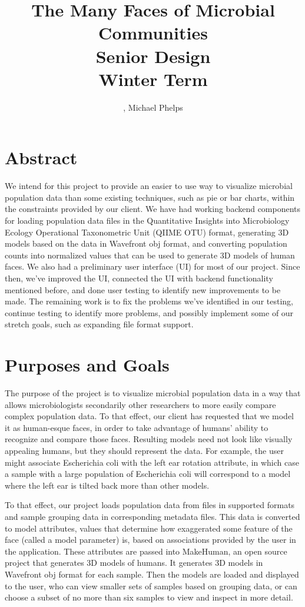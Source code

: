 \documentclass[letterpaper,10pt, onecolumn, draftclsnofoot]{IEEEtran}
\title{The Many Faces of Microbial Communities \\\large Senior Design\\Winter Term\\}
\author{\name, Michael Phelps}
\begin{document}
\maketitle
\section*{Abstract}
We intend for this project to provide an easier to use way to visualize microbial population data than some existing techniques, such as pie or bar charts, within the constraints provided by our client. We have had working backend components for loading population data files in the Quantitative Insights into Microbiology Ecology Operational Taxonometric Unit (QIIME OTU) format, generating 3D models based on the data in Wavefront obj format, and converting population counts into normalized values that can be used to generate 3D models of human faces. We also had a preliminary user interface (UI) for most of our project. Since then, we've improved the UI, connected the UI with backend functionality mentioned before, and done user testing to identify new improvements to be made. The remaining work is to fix the problems we've identified in our testing, continue testing to identify more problems, and possibly implement some of our stretch goals, such as expanding file format support.

\clearpage

\tableofcontents

\section{Purposes and Goals}

The purpose of the project is to visualize microbial population data in a way that allows microbiologists secondarily other researchers to more easily compare complex population data. To that effect, our client has requested that we model it as human-esque faces, in order to take advantage of humans' ability to recognize and compare those faces. Resulting models need not look like visually appealing humans, but they should represent the data. For example, the user might associate Escherichia coli with the left ear rotation attribute, in which case a sample with a large population of Escherichia coli will correspond to a model where the left ear is tilted back more than other models.

To that effect, our project loads population data from files in supported formats and sample grouping data in corresponding metadata files. This data is converted to model attributes, values that determine how exaggerated some feature of the face (called a model parameter) is, based on associations provided by the user in the application. These attributes are passed into MakeHuman, an open source project that generates 3D models of humans. It generates 3D models in Wavefront obj format for each sample. Then the models are loaded and displayed to the user, who can view smaller sets of samples based on grouping data, or can choose a subset of no more than six samples to view and inspect in more detail.
\end{document}
